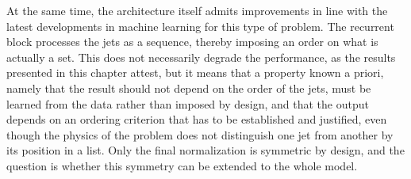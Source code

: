 At the same time, the architecture itself admits improvements in line with the latest developments in machine learning for this type of problem. The recurrent block processes the jets as a sequence, thereby imposing an order on what is actually a set. This does not necessarily degrade the performance, as the results presented in this chapter attest, but it means that a property known a priori, namely that the result should not depend on the order of the jets, must be learned from the data rather than imposed by design, and that the output depends on an ordering criterion that has to be established and justified, even though the physics of the problem does not distinguish one jet from another by its position in a list. Only the final normalization is symmetric by design, and the question is whether this symmetry can be extended to the whole model.


